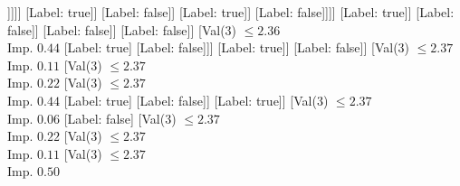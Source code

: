 \documentclass[margin=10pt]{standalone}
\begin{document}
\begin{forest}
																				[Val($3$) $ \leq 2.34$ \\ Imp. $0.01$
																					[Label: false]
																					[Val($3$) $ \leq 2.34$ \\ Imp. $0.05$
																						[Label: true]
																						[Val($3$) $ \leq 2.35$ \\ Imp. $0.01$
																							[Val($3$) $ \leq 2.35$ \\ Imp. $0.07$
																								[Val($3$) $ \leq 2.34$ \\ Imp. $0.02$
																									[Val($3$) $ \leq 2.34$ \\ Imp. $0.10$
																										[Val($3$) $ \leq 2.34$ \\ Imp. $0.02$
																											[Label: false]
																											[Val($3$) $ \leq 2.34$ \\ Imp. $0.15$
																												[Label: true]
																												[Val($3$) $ \leq 2.34$ \\ Imp. $0.03$
																													[Label: false]
																													[Val($3$) $ \leq 2.34$ \\ Imp. $0.38$
																														[Label: true]
																														[Label: false]]]]]
																										[Label: true]]
																									[Label: false]]
																								[Label: true]]
																							[Label: false]]]]
																				[Label: true]]
																			[Label: false]]
																		[Label: false]]
																	[Label: false]]
																[Val($3$) $ \leq 2.36$ \\ Imp. $0.44$
																	[Label: true]
																	[Label: false]]]
															[Label: true]]
														[Label: false]]
													[Val($3$) $ \leq 2.37$ \\ Imp. $0.11$
														[Val($3$) $ \leq 2.37$ \\ Imp. $0.22$
															[Val($3$) $ \leq 2.37$ \\ Imp. $0.44$
																[Label: true]
																[Label: false]]
															[Label: true]]
														[Val($3$) $ \leq 2.37$ \\ Imp. $0.06$
															[Label: false]
															[Val($3$) $ \leq 2.37$ \\ Imp. $0.22$
																[Val($3$) $ \leq 2.37$ \\ Imp. $0.11$
																	[Val($3$) $ \leq 2.37$ \\ Imp. $0.50$

\end{forest}
\end{document}
